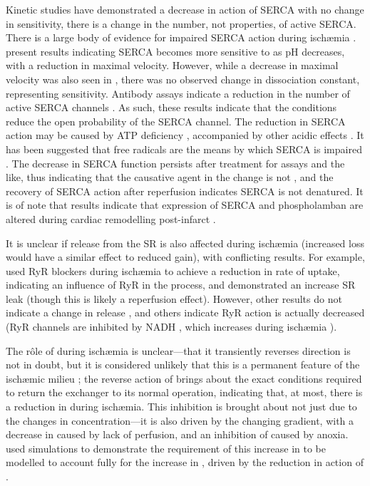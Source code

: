 \documentclass[../thesis-main.tex]{subfiles}
\begin{document}
Kinetic studies have demonstrated a decrease in action of SERCA with no change in \ca{} sensitivity, \idest{} there is a change in the number, not properties, of active SERCA. There is a large body of evidence for impaired SERCA action during isch\ae{}mia \citep{Dhalla1988, Temsah1999, Lee1967, Toba1978, Kaplan1992}. \citet{Krause1984} present results indicating SERCA becomes more sensitive to \cai{} as pH decreases, with a reduction in maximal velocity. However, while a decrease in maximal velocity was also seen in \citet{Kaplan1992}, there was no observed change in dissociation constant, representing \ca{} sensitivity. Antibody assays indicate a reduction in the number of active SERCA channels \citep{Levitsky1989}. As such, these results indicate that the conditions reduce the open probability of the SERCA channel. The reduction in SERCA action may be caused by ATP deficiency \citep{Camacho1993}, accompanied by other acidic effects \citep{Krause1984}. It has been suggested that free radicals are the means by which SERCA is impaired \citep{Temsah1999, Wang2013, Xu1997, Zweier1988}. The decrease in SERCA function persists after treatment for assays and the like, thus indicating that the causative agent in the change is not \cai{}, and the recovery of SERCA action after reperfusion indicates SERCA is not denatured. It is of note that results indicate that expression of SERCA and phospholamban are altered during cardiac remodelling post-infarct \citep{Sun2005}.

It is unclear if release from the SR is also affected during isch\ae{}mia (increased loss would have a similar effect to reduced gain), with conflicting results. For example, \citet{Feher1989} used RyR blockers during isch\ae{}mia to achieve a reduction in rate of \ca{} uptake, indicating an influence of RyR in the process, and \citet{Fauconnier2011} demonstrated an increase SR leak (though this is likely a reperfusion effect). However, other results do not indicate a change in release \citep{Kaplan1992}, and others indicate RyR action is actually decreased (RyR channels are inhibited by NADH \citep{Wang2013}, which increases during isch\ae{}mia \citep{Esumi1991}).

The r\^ole of \inaca{} during isch\ae{}mia is unclear---that it transiently reverses direction is not in doubt, but it is considered unlikely that this is a permanent feature of the isch\ae{}mic milieu \citep{Noble2002, Rodriguez2006}; the reverse action of \inaca{} brings about the exact conditions required to return the exchanger to its normal operation, indicating that, at most, there is a reduction in \inaca{} during isch\ae{}mia. This inhibition is brought about not just due to the changes in \ca{} concentration---it is also driven by the changing \na{} gradient, with a decrease in \nao{} caused by lack of perfusion, and an inhibition of \inak{} caused by anoxia. \citet{Noble2002} used simulations to demonstrate the requirement of this increase in \nao{} to be modelled to account fully for the increase in \cai{}, driven by the reduction in action of \inaca{}.
\end{document}
